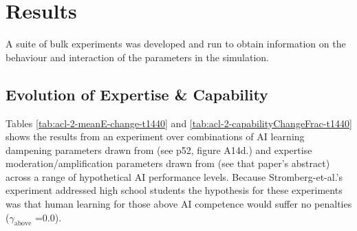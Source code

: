\documentclass[11pt]{article}
\begin{document}
\section{Results}\label{sec:results}

A suite of bulk experiments was developed and run to obtain information on the behaviour and interaction of the parameters in the simulation.

\subsection{Evolution of Expertise \& Capability}

Tables \ref{tab:acl-2-meanE-change-t1440} and \ref{tab:acl-2-capabilityChangeFrac-t1440} shows the results from an experiment over combinations of AI learning dampening parameters drawn from \cite{david_stromberg_generative_2026} (see p52, figure A14d.) and expertise moderation/amplification parameters drawn from \cite{fabrizio_dellacqua_navigating_nodate} (see that paper's abstract) across a range of hypothetical AI performance levels. Because Stromberg-et-al.'s experiment addressed high school students the hypothesis for these experiments was that human learning for those above AI competence would suffer no penalties ($\gamma_{\mathrm{above}}$ =0.0).
\end{document}

